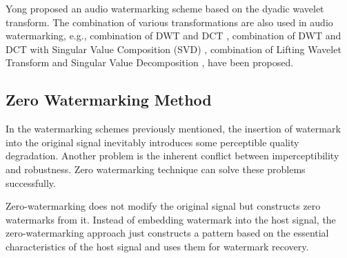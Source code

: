 \documentclass[12pt,a4paper]{report}
\begin{document}
Yong \cite{wang2010audio} proposed an audio watermarking scheme based on the dyadic wavelet transform. The combination of various transformations are also used in audio watermarking, e.g., combination of DWT and DCT \cite{ji2011quantified}, combination of DWT and DCT with Singular Value Composition (SVD) \cite{dhar2013dwt}, combination of Lifting Wavelet Transform and Singular Value Decomposition \cite{lei2012robust}, have been proposed.

\subsection{Zero Watermarking Method}

In the watermarking schemes previously mentioned, the insertion of watermark into the original signal inevitably introduces some perceptible quality degradation. Another problem is the inherent conflict between imperceptibility and robustness. Zero watermarking technique can solve these problems successfully.

\bigskip

Zero-watermarking does not modify the original signal but constructs zero watermarks from it. Instead of embedding watermark into the host signal, the zero-watermarking approach just constructs a pattern based on the essential characteristics of the host signal and uses them for watermark recovery.

\bigskip
\end{document}

